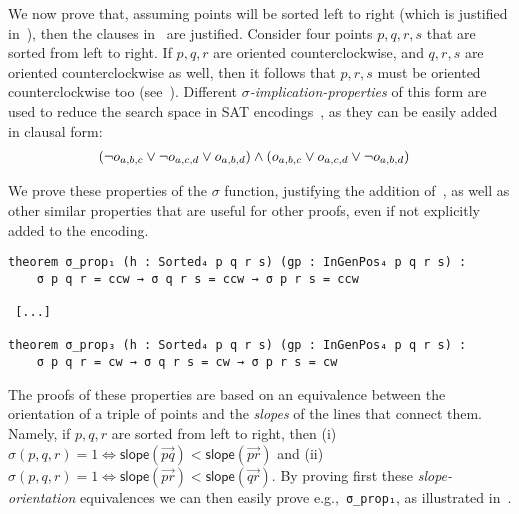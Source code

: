 We now prove that, assuming points will be sorted left to right (which is justified in~), then the clauses in~ are justified.
Consider four points $p, q, r, s$ that are sorted from left to right. If $p, q, r$ are oriented counterclockwise, and $q, r, s$ are oriented counterclockwise as well, then it follows that $p, r, s$ must be oriented counterclockwise too (see~). Different \emph{$\sigma$-implication-properties} of this form are used to reduce the search space in SAT encodings~\cite{emptyHexagonNumber,scheucherTwoDisjoint5holes2020,subercaseaux2023minimizing, szekeres_peters_2006}, as they can be easily added in clausal form:
\begin{align}
  &\left(\neg \orvar_{a, b, c} \lor \neg \orvar_{a, c, d} \lor \orvar_{a, b, d}\right) \land \left(\orvar_{a, b, c} \lor \orvar_{a, c, d} \lor  \neg \orvar_{a, b, d}\right)
\end{align}

We prove these properties of the $\sigma$ function, justifying the addition of~, as well as other similar properties that are useful for other proofs, even if not explicitly added to the encoding.
\begin{lstlisting}
theorem σ_prop₁ (h : Sorted₄ p q r s) (gp : InGenPos₄ p q r s) :
    σ p q r = ccw → σ q r s = ccw → σ p r s = ccw

 [...]

theorem σ_prop₃ (h : Sorted₄ p q r s) (gp : InGenPos₄ p q r s) :
    σ p q r = cw → σ q r s = cw → σ p r s = cw
\end{lstlisting}


The proofs of these properties are based on an equivalence between the orientation of a triple of points and the \emph{slopes} of the lines that connect them. Namely, if $p, q, r$  are sorted from left to right, then (i) $\sigma(p,q,r)=1 \iff \textsf{slope}(\overrightarrow{pq}) < \textsf{slope}(\overrightarrow{pr})$  and (ii) $\sigma(p,q,r)=1 \iff \textsf{slope}(\overrightarrow{pr}) < \textsf{slope}(\overrightarrow{qr})$. By proving first these \emph{slope-orientation} equivalences we can then easily prove e.g.,~\lstinline|σ_prop₁|, as illustrated in~.

